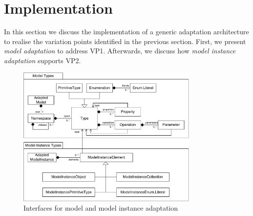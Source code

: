 \section{Implementation}
\label{sec:implementation}
	In this section we discuss the implementation of a generic adaptation
	architecture to realise the
	variation points identified in the previous section. First, we present
	\emph{model adaptation} to address VP1. Afterwards, we discuss how \emph{model
	instance adaptation} supports VP2.
	
	\begin{figure}[p]
			\centering
				\includegraphics[width=0.80\textwidth]{figures/coreconcepts.pdf}
			\caption{
			Interfaces for model and model instance adaptation
			}
			\label{fig:coreconcepts}
			
			\vspace{4.0em}
			

\end{figure}
